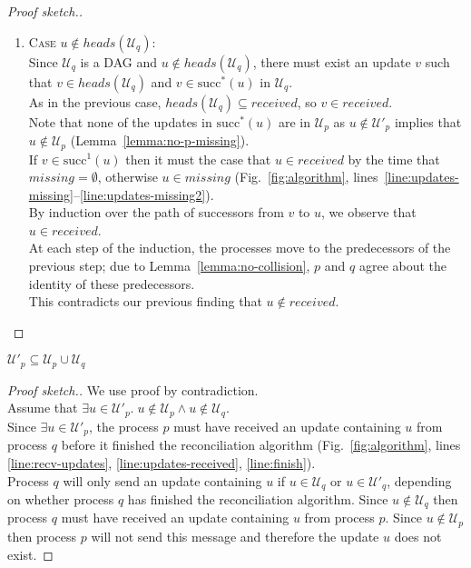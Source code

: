 \documentclass[manuscript,anonymous]{acmart}
\begin{document}
\begin{proof}[Proof sketch.]
\begin{enumerate}
    \item\textsc{Case} $u \notin \mathit{heads}(\mathcal{U}_q)$:\\
    Since $\mathcal{U}_q$ is a DAG and $u \notin \mathit{heads}(\mathcal{U}_q)$, there must exist an update $v$ such that $v \in \mathit{heads}(\mathcal{U}_q)$ and $v \in \mathrm{succ}^*(u)$ in $\mathcal{U}_q$.\\
    As in the previous case, $\mathit{heads}(\mathcal{U}_q) \subseteq \mathit{received}$, so $v \in \mathit{received}$.\\
    Note that none of the updates in $\mathrm{succ}^*(u)$ are in $\mathcal{U}_p$ as $u \notin \mathcal{U}'_p$ implies that  $u \notin \mathcal{U}_p$ (Lemma~\ref{lemma:no-p-missing}).\\
    If $v \in \mathrm{succ}^1(u)$ then it must the case that $u \in \mathit{received}$ by the time that $\mathit{missing} = \emptyset$, otherwise $u \in \mathit{missing}$ (Fig.~\ref{fig:algorithm}, lines~\ref{line:updates-missing}--\ref{line:updates-missing2}).\\
    By induction over the path of successors from $v$ to $u$, we observe that $u \in \mathit{received}$.\\
    At each step of the induction, the processes move to the predecessors of the previous step; due to Lemma~\ref{lemma:no-collision}, $p$ and $q$ agree about the identity of these predecessors.\\
    This contradicts our previous finding that $u \notin \mathit{received}$.
\end{enumerate}
\end{proof}

\begin{lemma}\label{lemma:no-extras}
$\mathcal{U}'_p \subseteq \mathcal{U}_p \cup \mathcal{U}_q$    
\end{lemma}
\begin{proof}[Proof sketch.]
We use proof by contradiction.\\
Assume that $\exists u \in \mathcal{U}'_p.\; u \notin \mathcal{U}_p  \land  u \notin \mathcal{U}_q$.\\
Since $\exists u \in \mathcal{U}'_p$, the process $p$ must have received an update containing $u$ from process $q$ before it finished the reconciliation algorithm (Fig.~\ref{fig:algorithm}, lines \ref{line:recv-updates}, \ref{line:updates-received}, \ref{line:finish}).\\
Process $q$ will only send an update containing $u$ if $u \in \mathcal{U}_q$ or $u \in \mathcal{U}'_q$, depending on whether process $q$ has finished the reconciliation algorithm.
Since $u \notin \mathcal{U}_q$ then process $q$ must have received an update containing $u$ from process $p$.
Since $u \notin \mathcal{U}_p$ then process $p$ will not send this message and therefore the update $u$ does not exist.
\end{proof}
\end{document}
